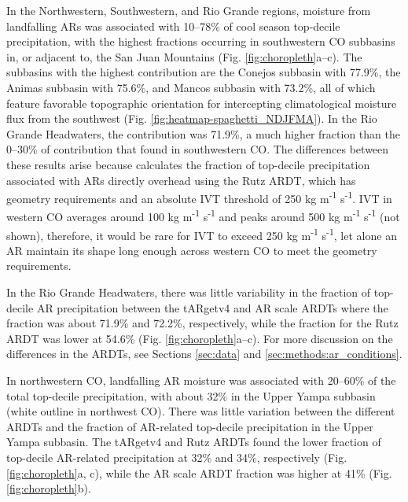 \documentclass[draft]{agujournal2019}
\begin{document}
In the Northwestern, Southwestern, and Rio Grande regions, moisture from landfalling ARs was associated with 10--78\% of cool season top-decile precipitation, with the highest fractions occurring in southwestern CO subbasins in, or adjacent to, the San Juan Mountains (Fig. \ref{fig:choropleth}a--c). The subbasins with the highest contribution are the Conejos subbasin with 77.9\%, the Animas subbasin with 75.6\%, and Mancos subbasin with 73.2\%, all of which feature favorable topographic orientation for intercepting climatological moisture flux from the southwest (Fig. \ref{fig:heatmap-spaghetti_NDJFMA}). In the Rio Grande Headwaters, the contribution was 71.9\%, a much higher fraction than the 0--30\% of contribution that  found in southwestern CO. The differences between these results arise because  calculates the fraction of top-decile precipitation associated with ARs directly overhead using the Rutz ARDT, which has geometry requirements and an absolute IVT threshold of 250 kg m\textsuperscript{-1} s\textsuperscript{-1}. IVT in western CO averages around 100 kg m\textsuperscript{-1} s\textsuperscript{-1} and peaks around 500 kg m\textsuperscript{-1} s\textsuperscript{-1} (not shown), therefore, it would be rare for IVT to exceed 250 kg m\textsuperscript{-1} s\textsuperscript{-1}, let alone an AR maintain its shape long enough across western CO to meet the geometry requirements.

In the Rio Grande Headwaters, there was little variability in the fraction of top-decile AR precipitation between the tARgetv4 and AR scale ARDTs where the fraction was about 71.9\% and 72.2\%, respectively, while the fraction for the Rutz ARDT was lower at 54.6\% (Fig. \ref{fig:choropleth}a--c). For more discussion on the differences in the ARDTs, see Sections \ref{sec:data} and \ref{sec:methods:ar_conditions}. 

In northwestern CO, landfalling AR moisture was associated with 20--60\% of the total top-decile precipitation, with about 32\% in the Upper Yampa subbasin (white outline in northwest CO). There was little variation between the different ARDTs and the fraction of AR-related top-decile precipitation in the Upper Yampa subbasin. The tARgetv4 and Rutz ARDTs found the lower fraction of top-decile AR-related precipitation at 32\% and 34\%, respectively (Fig. \ref{fig:choropleth}a, c), while the AR scale ARDT fraction was higher at 41\% (Fig. \ref{fig:choropleth}b). 
\end{document}
